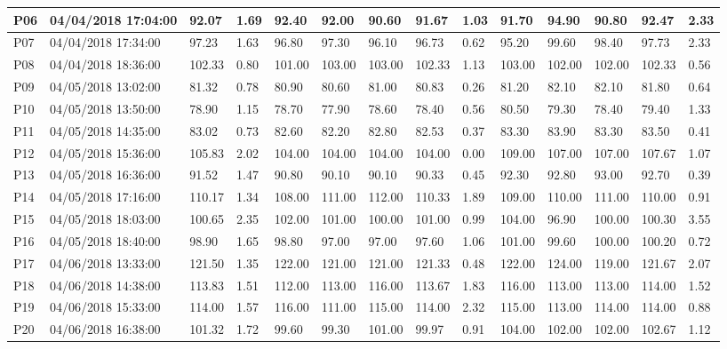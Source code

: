 \begin{table}
\begin{adjustbox}{angle=90}
\begin{tabular}{|l|l|l|l|l|l|l|l|l|l|l|l|l|l|}
        P06 & 04/04/2018 17:04:00 & 92.07 & 1.69 & 92.40 & 92.00 & 90.60 & 91.67 & 1.03 & 91.70 & 94.90 & 90.80 & 92.47 & 2.33 \\ \hline
        P07 & 04/04/2018 17:34:00 & 97.23 & 1.63 & 96.80 & 97.30 & 96.10 & 96.73 & 0.62 & 95.20 & 99.60 & 98.40 & 97.73 & 2.33 \\ \hline
        P08 & 04/04/2018 18:36:00 & 102.33 & 0.80 & 101.00 & 103.00 & 103.00 & 102.33 & 1.13 & 103.00 & 102.00 & 102.00 & 102.33 & 0.56 \\ \hline
        P09 & 04/05/2018 13:02:00 & 81.32 & 0.78 & 80.90 & 80.60 & 81.00 & 80.83 & 0.26 & 81.20 & 82.10 & 82.10 & 81.80 & 0.64 \\ \hline
        P10 & 04/05/2018 13:50:00 & 78.90 & 1.15 & 78.70 & 77.90 & 78.60 & 78.40 & 0.56 & 80.50 & 79.30 & 78.40 & 79.40 & 1.33 \\ \hline
        P11 & 04/05/2018 14:35:00 & 83.02 & 0.73 & 82.60 & 82.20 & 82.80 & 82.53 & 0.37 & 83.30 & 83.90 & 83.30 & 83.50 & 0.41 \\ \hline
        P12 & 04/05/2018 15:36:00 & 105.83 & 2.02 & 104.00 & 104.00 & 104.00 & 104.00 & 0.00 & 109.00 & 107.00 & 107.00 & 107.67 & 1.07 \\ \hline
        P13 & 04/05/2018 16:36:00 & 91.52 & 1.47 & 90.80 & 90.10 & 90.10 & 90.33 & 0.45 & 92.30 & 92.80 & 93.00 & 92.70 & 0.39 \\ \hline
        P14 & 04/05/2018 17:16:00 & 110.17 & 1.34 & 108.00 & 111.00 & 112.00 & 110.33 & 1.89 & 109.00 & 110.00 & 111.00 & 110.00 & 0.91 \\ \hline
        P15 & 04/05/2018 18:03:00 & 100.65 & 2.35 & 102.00 & 101.00 & 100.00 & 101.00 & 0.99 & 104.00 & 96.90 & 100.00 & 100.30 & 3.55 \\ \hline
        P16 & 04/05/2018 18:40:00 & 98.90 & 1.65 & 98.80 & 97.00 & 97.00 & 97.60 & 1.06 & 101.00 & 99.60 & 100.00 & 100.20 & 0.72 \\ \hline
        P17 & 04/06/2018 13:33:00 & 121.50 & 1.35 & 122.00 & 121.00 & 121.00 & 121.33 & 0.48 & 122.00 & 124.00 & 119.00 & 121.67 & 2.07 \\ \hline
        P18 & 04/06/2018 14:38:00 & 113.83 & 1.51 & 112.00 & 113.00 & 116.00 & 113.67 & 1.83 & 116.00 & 113.00 & 113.00 & 114.00 & 1.52 \\ \hline
        P19 & 04/06/2018 15:33:00 & 114.00 & 1.57 & 116.00 & 111.00 & 115.00 & 114.00 & 2.32 & 115.00 & 113.00 & 114.00 & 114.00 & 0.88 \\ \hline
        P20 & 04/06/2018 16:38:00 & 101.32 & 1.72 & 99.60 & 99.30 & 101.00 & 99.97 & 0.91 & 104.00 & 102.00 & 102.00 & 102.67 & 1.12 \\ \hline

\end{tabular}
\end{adjustbox}
\end{table}
